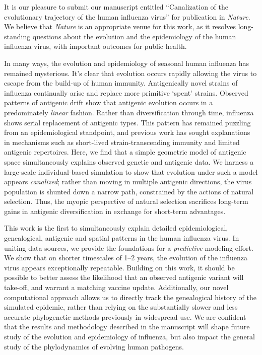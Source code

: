 \documentclass[stdletter,letterpaper,addrfromright,orderfromdateto,dateleft,11pt,noaddrto]{newlfm}
\begin{document}
\begin{newlfm}

It is our pleasure to submit our manuscript entitled ``Canalization of the evolutionary trajectory of the human influenza virus'' for publication in \textsl{Nature}.  We believe that \textsl{Nature} is an appropriate venue for this work, as it resolves long-standing questions about the evolution and the epidemiology of the human influenza virus, with important outcomes for public health.

In many ways, the evolution and epidemiology of seasonal human influenza has remained mysterious.  It's clear that evolution occurs rapidly allowing the virus to escape from the build-up of human immunity.  Antigenically novel strains of influenza continually arise and replace more primitive `spent' strains.  Observed patterns of antigenic drift show that antigenic evolution occurs in a predominately \textsl{linear} fashion.  Rather than diversification through time, influenza shows serial replacement of antigenic types.  This pattern has remained puzzling from an epidemiological standpoint, and previous work has sought explanations in mechanisms such as short-lived strain-transcending immunity and limited antigenic repertoires.  Here, we find that a simple geometric model of antigenic space simultaneously explains observed genetic and antigenic data.  We harness a large-scale individual-based simulation to show that evolution under such a model appears \textsl{canalized}; rather than moving in multiple antigenic directions, the virus population is shunted down a narrow path, constrained by the actions of natural selection.  Thus, the myopic perspective of natural selection sacrifices long-term gains in antigenic diversification in exchange for short-term advantages.

This work is the first to simultaneously explain detailed epidemiological, genealogical, antigenic and spatial patterns in the human influenza virus.  In uniting data sources, we provide the foundations for a \textsl{predictive} modeling effort.  We show that on shorter timescales of 1--2 years, the evolution of the influenza virus appears exceptionally repeatable.  Building on this work, it should be possible to better assess the likelihood that an observed antigenic variant will take-off, and warrant a matching vaccine update.  Additionally, our novel computational approach allows us to directly track the genealogical history of the simulated epidemic, rather than relying on the substantially slower and less accurate phylogenetic methods previously in widespread use.  We are confident that the results and methodology described in the manuscript will shape future study of the evolution and epidemiology of influenza, but also impact the general study of the phylodynamics of evolving human pathogens.

\end{newlfm}
\end{document}
